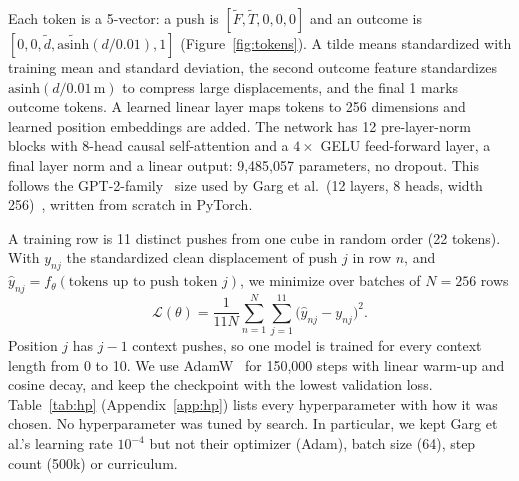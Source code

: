 \documentclass{article}
\begin{document}
Each token is a 5-vector: a push is $[\tilde F,\tilde T,0,0,0]$ and an outcome is $[0,0,\tilde d,\widetilde{\mathrm{asinh}}(d/0.01),1]$ (Figure~\ref{fig:tokens}). A tilde means standardized with training mean and standard deviation, the second outcome feature standardizes $\mathrm{asinh}(d/0.01\,\mathrm{m})$ to compress large displacements, and the final 1 marks outcome tokens. A learned linear layer maps tokens to 256 dimensions and learned position embeddings are added. The network has 12 pre-layer-norm blocks with 8-head causal self-attention and a $4\times$ GELU feed-forward layer, a final layer norm and a linear output: 9,485,057 parameters, no dropout. This follows the GPT-2-family~\cite{radford2019} size used by Garg et al.\ (12 layers, 8 heads, width 256)~\cite{garg2022,vaswani2017}, written from scratch in PyTorch.

A training row is 11 distinct pushes from one cube in random order (22 tokens). With $y_{nj}$ the standardized clean displacement of push $j$ in row $n$, and $\hat y_{nj}=f_\theta(\text{tokens up to push token }j)$, we minimize over batches of $N=256$ rows
\begin{equation}
\mathcal L(\theta)=\frac{1}{11N}\sum_{n=1}^{N}\sum_{j=1}^{11}\big(\hat y_{nj}-y_{nj}\big)^2 .
\end{equation}
Position $j$ has $j-1$ context pushes, so one model is trained for every context length from 0 to 10. We use AdamW~\cite{loshchilov2017} for 150,000 steps with linear warm-up and cosine decay, and keep the checkpoint with the lowest validation loss. Table~\ref{tab:hp} (Appendix~\ref{app:hp}) lists every hyperparameter with how it was chosen. No hyperparameter was tuned by search. In particular, we kept Garg et al.'s learning rate $10^{-4}$ but not their optimizer (Adam), batch size (64), step count (500k) or curriculum.
\end{document}
